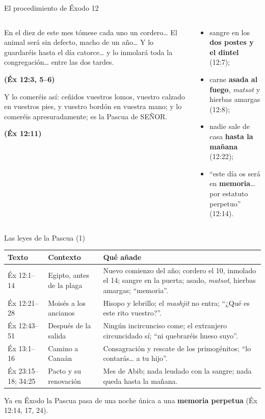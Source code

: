 \documentclass[hyperref={bookmarks=false},aspectratio=169]{beamer}
\newcommand{\SENOR}{S{\fontsize{0.78em}{1em}\selectfont EÑOR}}
\newcommand{\fuente}[1]{\par\hfill{\upshape\bfseries\footnotesize\textcolor{tierraroja}{#1}}}
\newcommand{\destacar}[1]{\textbf{\textcolor{tierraroja}{#1}}}
\begin{document}
\begin{frame}{El procedimiento de Éxodo 12}
\begin{columns}[t,onlytextwidth]
\begin{column}{0.55\textwidth}
\begin{cita}En el diez de este mes tómese cada uno un cordero\ldots{} El animal será sin defecto, macho de un año\ldots{} Y lo guardaréis hasta el día catorce\ldots{} y lo inmolará toda la congregación\ldots{} entre las dos tardes.\fuente{(Éx 12:3, 5--6)}\end{cita}
\begin{cita}Y lo comeréis así: ceñidos vuestros lomos, vuestro calzado en vuestros pies, y vuestro bordón en vuestra mano; y lo comeréis apresuradamente; es la Pascua de \SENOR.\fuente{(Éx 12:11)}\end{cita}
\end{column}
\begin{column}{0.43\textwidth}\small
\begin{itemize}
\item sangre en los \destacar{dos postes y el dintel} (12:7);
\item carne \destacar{asada al fuego}, \emph{matsot} y hierbas amargas (12:8);
\item nadie sale de casa \destacar{hasta la mañana} (12:22);
\item ``este día os será en \destacar{memoria}\ldots{} por estatuto perpetuo'' (12:14).
\end{itemize}
\end{column}
\end{columns}
\end{frame}

\begin{frame}{Las leyes de la Pascua (1)}
\scriptsize\renewcommand{\arraystretch}{1.15}
\begin{tabular}{@{}L{1.9cm}L{2.6cm}L{7.6cm}@{}}
\toprule
\textbf{Texto} & \textbf{Contexto} & \textbf{Qué añade} \\ \midrule
Éx 12:1--14 & Egipto, antes de la plaga & Nuevo comienzo del año; cordero el 10, inmolado el 14; sangre en la puerta; asado, \emph{matsot}, hierbas amargas; ``memoria''. \\
Éx 12:21--28 & Moisés a los ancianos & Hisopo y lebrillo; el \emph{mashjit} no entra; ``¿Qué es este rito vuestro?''. \\
Éx 12:43--51 & Después de la salida & Ningún incircunciso come; el extranjero circuncidado sí; ``ni quebraréis hueso suyo''. \\
Éx 13:1--16 & Camino a Canaán & Consagración y rescate de los primogénitos; ``lo contarás\ldots{} a tu hijo''. \\
Éx 23:15--18; 34:25 & Pacto y su renovación & Mes de Abib; nada leudado con la sangre; nada queda hasta la mañana. \\
\bottomrule
\end{tabular}\par\medskip
\small\RaggedRight Ya en Éxodo la Pascua pasa de una noche única a una \destacar{memoria perpetua} (Éx 12:14, 17, 24).
\end{frame}
\end{document}
